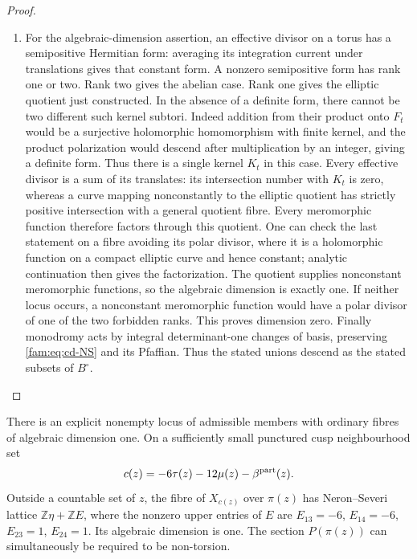\begin{proof}
\begin{enumerate}[label=\arabic*.,leftmargin=*]
\item For the algebraic-dimension assertion, an effective divisor on a torus
has a semipositive Hermitian form: averaging its integration current under
translations gives that constant form. A nonzero semipositive form has
rank one or two. Rank two gives the abelian case. Rank one gives the
elliptic quotient just constructed. In the absence of a definite form,
there cannot be two different such kernel subtori. Indeed addition from
their product onto $F_t$ would be a surjective holomorphic homomorphism
with finite kernel, and the product polarization would descend after
multiplication by an integer, giving a definite form. Thus there is a
single kernel $K_t$ in this case. Every effective divisor is a sum of
its translates: its intersection number with $K_t$ is zero, whereas a
curve mapping nonconstantly to the elliptic quotient has strictly positive
intersection with a general quotient fibre. Every meromorphic function
therefore factors through this quotient. One can check the last statement
on a fibre avoiding its polar divisor, where it is a holomorphic function
on a compact elliptic curve and hence constant; analytic continuation
then gives the factorization. The quotient supplies nonconstant
meromorphic functions, so the algebraic dimension is exactly one.
If neither locus occurs, a nonconstant meromorphic function would have
a polar divisor of one of the two forbidden ranks. This proves dimension
zero. Finally monodromy acts by integral determinant-one changes of basis,
preserving \eqref{fam:eq:cd-NS} and its Pfaffian. Thus the stated unions descend
as the stated subsets of $B^\circ$.
\end{enumerate}
\end{proof}





\begin{proposition}\hypertarget{tag-01QX}{}\label{fam:src:D.1.7}\label{fam:st:D.1.7}

There is an explicit nonempty locus of admissible members with ordinary
fibres of algebraic dimension one. On a sufficiently small punctured
cusp neighbourhood set
\[
 c(z)=-6\tau(z)-12\mu(z)-\beta^{\rm part}(z).
\]
Outside a countable set of $z$, the fibre of $X_{c(z)}$ over $\pi(z)$ has
Neron--Severi lattice $\mathbb Z\eta+\mathbb ZE$, where the nonzero upper
entries of $E$ are
$E_{13}=-6$, $E_{14}=-6$, $E_{23}=1$, $E_{24}=1$.
Its algebraic dimension is one. The section $P(\pi(z))$ can simultaneously
be required to be non-torsion.
\end{proposition}


